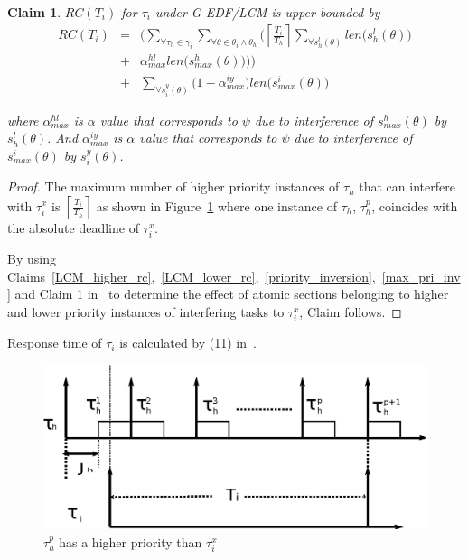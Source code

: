 \documentclass[conference]{IEEEtran}
\newtheorem{clm}{Claim}
\begin{document}
\begin{clm}\label{GEDF/LCM response time}
$RC(T_i)$ for $\tau_i$ under G-EDF/LCM is upper bounded by
\begin{eqnarray}
RC(T_i) & = & \Bigg(\sum_{\forall \tau_h \in \gamma_i}\sum_{\forall\theta \in \theta_i \wedge \theta_h}\Bigg(\left\lceil\frac{T_{i}}{T_{h}}\right\rceil\sum_{\forall s_{h}^{l}(\theta)}len\Big(s_{h}^{l}(\theta)\Big)\nonumber\\
& + & \alpha_{max}^{hl}len\Big(s_{max}^{h}(\theta)\Big)\Bigg)\Bigg)\nonumber\\
& + & \sum_{\forall s_{i}^{y}(\theta)}\Big(1-\alpha_{max}^{iy}\Big)len\Big(s_{max}^i(\theta)\Big)  
\label{eq78}\end{eqnarray} 

where $\alpha_{max}^{hl}$ is $\alpha$ value that corresponds to $\psi$ due to interference of $s_{max}^h(\theta)$ by $s_h^l(\theta)$. And $\alpha_{max}^{iy}$ is $\alpha$ value that corresponds to $\psi$ due to interference of $s_{max}^i(\theta)$ by $s_i^y(\theta)$.
\end{clm}

\begin{proof}
The maximum number of higher priority instances of $\tau_h$ that can interfere with $\tau_i^x$ is $\left\lceil\frac{T_i}{T_h}\right\rceil$ as shown in Figure~\ref{fig17} where one instance of $\tau_h$, $\tau_h^p$, coincides with the absolute deadline of $\tau_i^x$.

By using Claims~\ref{LCM_higher_rc},~\ref{LCM_lower_rc},~\ref{priority_inversion},~\ref{max_pri_inv} and Claim 1 in~\cite{stmconcurrencycontrol:emsoft11} to determine the effect of atomic sections belonging to higher and lower priority instances of interfering tasks to $\tau_i^x$, Claim follows.
\end{proof}


Response time of $\tau_{i}$ is calculated by (11) in~\cite{stmconcurrencycontrol:emsoft11}.
\begin{figure}
\begin{centering}
\includegraphics[scale=0.5]{figures/figure18}
\par\end{centering}
\caption{\label{fig17}$\tau_h^p$ has a higher priority than $\tau_i^x$}
\end{figure}
\end{document}
